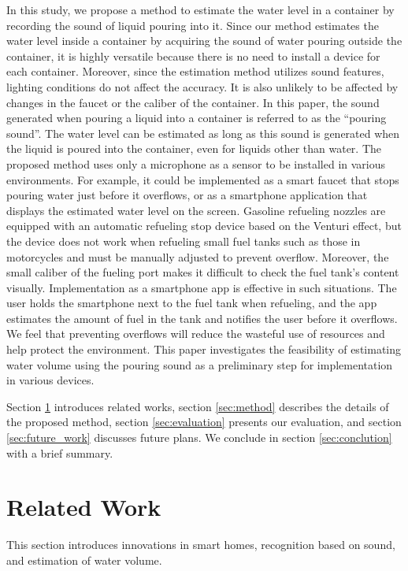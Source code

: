 \documentclass[sigconf,authordraft]{acmart}
\begin{document}
In this study, we propose a method to estimate the water level in a container by recording the sound of liquid pouring into it. Since our method estimates the water level inside a container by acquiring the sound of water pouring outside the container, it is highly versatile because there is no need to install a device for each container. Moreover, since the estimation method utilizes sound features, lighting conditions do not affect the accuracy. It is also unlikely to be affected by changes in the faucet or the caliber of the container. In this paper, the sound generated when pouring a liquid into a container is referred to as the ``pouring sound''. The water level can be estimated as long as this sound is generated when the liquid is poured into the container, even for liquids other than water. The proposed method uses only a microphone as a sensor to be installed in various environments. For example, it could be implemented as a smart faucet that stops pouring water just before it overflows, or as a smartphone application that displays the estimated water level on the screen. Gasoline refueling nozzles are equipped with an automatic refueling stop device based on the Venturi effect, but the device does not work when refueling small fuel tanks such as those in motorcycles and must be manually adjusted to prevent overflow. Moreover, the small caliber of the fueling port makes it difficult to check the fuel tank's content visually. Implementation as a smartphone app is effective in such situations. The user holds the smartphone next to the fuel tank when refueling, and the app estimates the amount of fuel in the tank and notifies the user before it overflows. We feel that preventing overflows will reduce the wasteful use of resources and help protect the environment. This paper investigates the feasibility of estimating water volume using the pouring sound as a preliminary step for implementation in various devices.\par

Section \ref{sec:related} introduces related works, section \ref{sec:method} describes the details of the proposed method, section \ref{sec:evaluation} presents our evaluation, and section \ref{sec:future_work} discusses future plans. We conclude in section \ref{sec:conclution} with a brief summary.



\section{Related Work}
\label{sec:related}
This section introduces innovations in smart homes, recognition based on sound, and estimation of water volume.
\end{document}
